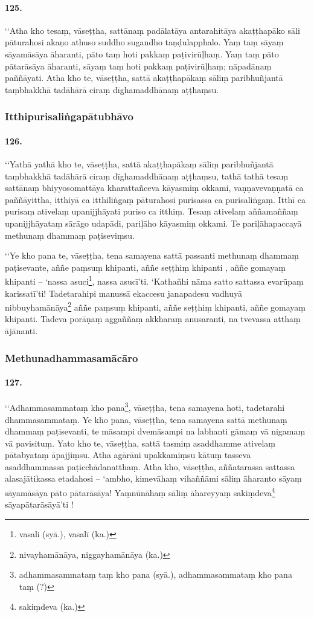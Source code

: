\paragraph{125.} ‘‘Atha kho tesaṃ, vāseṭṭha, sattānaṃ padālatāya antarahitāya akaṭṭhapāko sāli pāturahosi akaṇo athuso suddho sugandho taṇḍulapphalo. Yaṃ taṃ sāyaṃ sāyamāsāya āharanti, pāto taṃ hoti pakkaṃ paṭivirūḷhaṃ. Yaṃ taṃ pāto pātarāsāya āharanti, sāyaṃ taṃ hoti pakkaṃ paṭivirūḷhaṃ; nāpadānaṃ paññāyati. Atha kho te, vāseṭṭha, sattā akaṭṭhapākaṃ sāliṃ paribhuñjantā taṃbhakkhā tadāhārā ciraṃ dīghamaddhānaṃ aṭṭhaṃsu.

\subsubsection{Itthipurisaliṅgapātubhāvo}

\paragraph{126.} ‘‘Yathā yathā kho te, vāseṭṭha, sattā akaṭṭhapākaṃ sāliṃ paribhuñjantā taṃbhakkhā tadāhārā ciraṃ dīghamaddhānaṃ aṭṭhaṃsu, tathā tathā tesaṃ sattānaṃ bhiyyosomattāya kharattañceva kāyasmiṃ okkami, vaṇṇavevaṇṇatā ca paññāyittha, itthiyā ca itthiliṅgaṃ pāturahosi purisassa ca purisaliṅgaṃ. Itthī ca purisaṃ ativelaṃ upanijjhāyati puriso ca itthiṃ. Tesaṃ ativelaṃ aññamaññaṃ upanijjhāyataṃ sārāgo udapādi, pariḷāho kāyasmiṃ okkami. Te pariḷāhapaccayā methunaṃ dhammaṃ paṭiseviṃsu.

‘‘Ye kho pana te, vāseṭṭha, tena samayena sattā passanti methunaṃ dhammaṃ paṭisevante, aññe paṃsuṃ khipanti, aññe seṭṭhiṃ khipanti , aññe gomayaṃ khipanti – ‘nassa asuci\footnote{vasali (syā.), vasalī (ka.)}, nassa asucī’ti. ‘Kathañhi nāma satto sattassa evarūpaṃ karissatī’ti! Tadetarahipi manussā ekaccesu janapadesu vadhuyā nibbuyhamānāya\footnote{nivayhamānāya, niggayhamānāya (ka.)} aññe paṃsuṃ khipanti, aññe seṭṭhiṃ khipanti, aññe gomayaṃ khipanti. Tadeva porāṇaṃ aggaññaṃ akkharaṃ anusaranti, na tvevassa atthaṃ ājānanti.

\subsubsection{Methunadhammasamācāro}

\paragraph{127.} ‘‘Adhammasammataṃ kho pana\footnote{adhammasammataṃ taṃ kho pana (syā.), adhammasammataṃ kho pana taṃ (?)}, vāseṭṭha, tena samayena hoti, tadetarahi dhammasammataṃ. Ye kho pana, vāseṭṭha, tena samayena sattā methunaṃ dhammaṃ paṭisevanti, te māsampi dvemāsampi na labhanti gāmaṃ vā nigamaṃ vā pavisituṃ. Yato kho te, vāseṭṭha, sattā tasmiṃ asaddhamme ativelaṃ pātabyataṃ āpajjiṃsu. Atha agārāni upakkamiṃsu kātuṃ tasseva asaddhammassa paṭicchādanatthaṃ. Atha kho, vāseṭṭha, aññatarassa sattassa alasajātikassa etadahosi – ‘ambho, kimevāhaṃ vihaññāmi sāliṃ āharanto sāyaṃ sāyamāsāya pāto pātarāsāya! Yaṃnūnāhaṃ sāliṃ āhareyyaṃ sakiṃdeva\footnote{sakiṃdeva (ka.)} sāyapātarāsāyā’ti !

